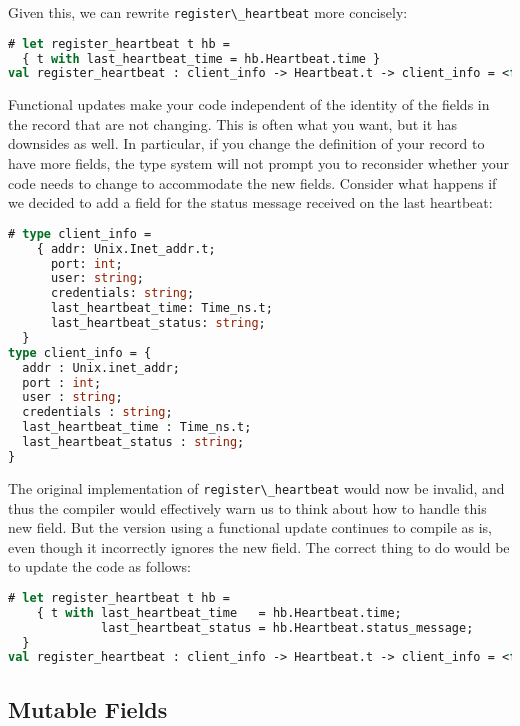 Given this, we can rewrite \passthrough{\lstinline!register\_heartbeat!}
more concisely:

\begin{lstlisting}[language=Caml]
# let register_heartbeat t hb =
  { t with last_heartbeat_time = hb.Heartbeat.time }
val register_heartbeat : client_info -> Heartbeat.t -> client_info = <fun>
\end{lstlisting}

Functional updates make your code independent of the identity of the
fields in the record that are not changing. This is often what you want,
but it has downsides as well. In particular, if you change the
definition of your record to have more fields, the type system will not
prompt you to reconsider whether your code needs to change to
accommodate the new fields. Consider what happens if we decided to add a
field for the status message received on the last heartbeat:

\begin{lstlisting}[language=Caml]
# type client_info =
    { addr: Unix.Inet_addr.t;
      port: int;
      user: string;
      credentials: string;
      last_heartbeat_time: Time_ns.t;
      last_heartbeat_status: string;
  }
type client_info = {
  addr : Unix.inet_addr;
  port : int;
  user : string;
  credentials : string;
  last_heartbeat_time : Time_ns.t;
  last_heartbeat_status : string;
}
\end{lstlisting}

The original implementation of
\passthrough{\lstinline!register\_heartbeat!} would now be invalid, and
thus the compiler would effectively warn us to think about how to handle
this new field. But the version using a functional update continues to
compile as is, even though it incorrectly ignores the new field. The
correct thing to do would be to update the code as follows:

\begin{lstlisting}[language=Caml]
# let register_heartbeat t hb =
    { t with last_heartbeat_time   = hb.Heartbeat.time;
             last_heartbeat_status = hb.Heartbeat.status_message;
  }
val register_heartbeat : client_info -> Heartbeat.t -> client_info = <fun>
\end{lstlisting}

\hypertarget{mutable-fields}{%
\subsection{Mutable Fields}\label{mutable-fields}}

